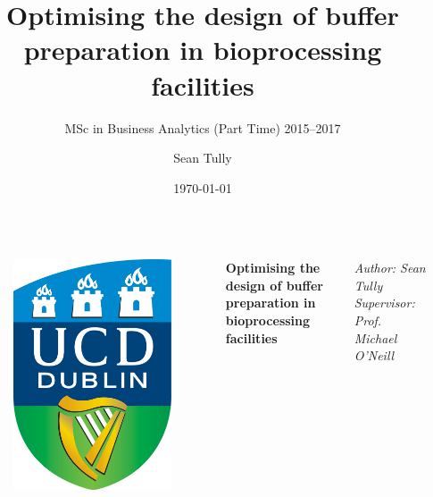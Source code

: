 \documentclass[final]{beamer}
\title{Optimising the design of buffer preparation in bioprocessing facilities}
\institute[UCD]{University College Dublin}
\date{\today}
\subtitle{MSc in Business Analytics (Part Time) 2015--2017}
\author{Sean Tully}
\begin{document}
    \begin{frame}[t]
        \begin{columns}
                \begin{figure}
                    \centering
                    \includegraphics[angle=0,scale=0.08]{ucd_logo.png}
                \end{figure}
            \centering
            \vspace{0.2cm}
            
            \Huge{\textbf{Optimising the design of buffer preparation in
                 bioprocessing facilities}}
                 
            \huge \emph{Author: Sean Tully \quad \quad Supervisor: Prof.
                Michael O'Neill}
                

\end{columns}
\end{frame}
\end{document}
